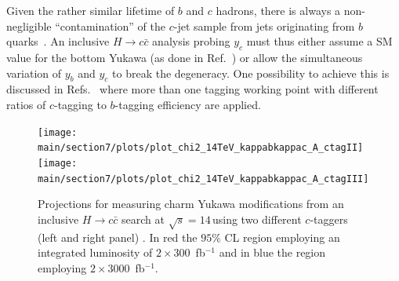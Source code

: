 \documentclass[../report.tex]{subfiles}
\providecommand{\main}{..}
\begin{document}
Given the rather similar lifetime of $b$ and $c$ hadrons, there is always
a non-negligible ``contamination'' of the $c$-jet sample 
from jets originating from $b$ quarks~\cite{Perez:2015aoa}.
An inclusive $H\to c\bar c$ analysis probing $y_c$ must thus either assume a SM value 
for the bottom Yukawa (as done in Ref.~\cite{Aaboud:2018fhh}) or allow the 
simultaneous variation of $y_b$ and $y_c$ to break the degeneracy.  
One possibility to achieve this is discussed  in Refs.~\cite{Perez:2015aoa,Perez:2015lra} where more than one tagging working point with different ratios of $c$-tagging to $b$-tagging efficiency are applied.

\begin{figure}[]
	\centering
	\texttt{[image: \\main/section7/plots/plot\_chi2\_14TeV\_kappabkappac\_A\_ctagII]}
	\texttt{[image: \\main/section7/plots/plot\_chi2\_14TeV\_kappabkappac\_A\_ctagIII]}
	\caption{Projections for measuring charm Yukawa modifications from an inclusive 
		$H\to c\bar c$ search at $\sqrt{s}=14$\,\UTeV using two different 
		$c$-taggers (left and right panel) \cite{Perez:2015lra}.
		In red the $95\%$ CL region employing an integrated luminosity 
		of $2\times 300$~fb$^{-1}$ and in blue the region 
		employing $2\times 3000$~fb$^{-1}$.
	\label{fig:inclusiveforecast}}
\end{figure}
\end{document}
